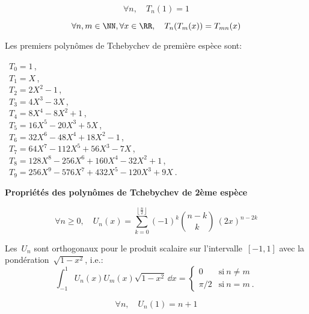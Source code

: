 \begin{equation}
\forall n, \quad
  T_n(1)=1
\end{equation}

\begin{equation}
\forall n,m\in\NN, \forall x\in\RR, \quad
  T_n(T_m(x))=T_{mn}(x)
\end{equation}

\medskip
{}
Les premiers polynômes de Tchebychev de première espèce sont:

\noindent
 ~$T_0 = 1 \,$,\\
 ~$T_1 = X \,$,\\
 ~$T_2 = 2X^2 - 1 \,$,\\
 ~$T_3 = 4X^3 - 3X \,$,\\
 ~$ T_4 = 8X^4 - 8X^2 + 1 \,$,\\
 ~$ T_5 = 16X^5 - 20X^3 + 5X \,$,\\
 ~$ T_6 = 32X^6 - 48X^4 + 18X^2 - 1 \,$,\\
 ~$ T_7 = 64X^7 - 112X^5 + 56X^3 - 7X \,$,\\
 ~$ T_8 = 128X^8 - 256X^6 + 160X^4 - 32X^2 + 1 \,$,\\
 ~$T_9 = 256X^9 - 576X^7 + 432X^5 - 120X^3 + 9X~.$ 

\medskip
\textbf{Propriétés des polynômes de Tchebychev de 2ème espèce}

\begin{equation}\forall n\ge 0, \quad
  U_n(x)=\sum_{k=0}^{\left\lfloor \frac n2\right \rfloor}(-1)^k \binom{n-k}k~(2x)^{n-2k}
\end{equation}

 Les~$U_n$ sont orthogonaux pour le produit scalaire 
sur l'intervalle~$[-1,1]$ avec la pondération~$\sqrt{1-x^2}$, i.e.:
\begin{equation}
  \int_{-1}^1 U_n(x)U_m(x)\sqrt{1-x^2}\,\dd x = \begin{cases} 0&\text{si}~n\ne m\\ \pi/2 &\text{si}~n=m~. \end{cases} 
\end{equation}

\begin{equation}\forall n,\quad 
  U_n(1)=n+1
\end{equation}

